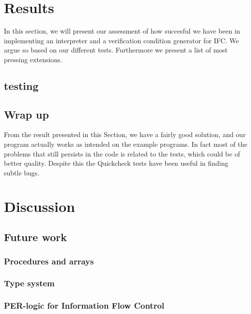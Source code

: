 \section{Results}
In this section, we will present our assessment of how succesful we have been in implementing an interpreter and a verification condition generator for IFC. We argue so based on our different tests. Furthermore we present a list of most pressing extensions.

\subsection{testing}


\subsection*{Wrap up}
From the result presented in this Section, we have a fairly good solution, and our program actually works as intended on the example programs.
In fact most of the problems that still persists in the code is related to the tests, which could be of better quality. Despite this the Quickcheck tests have been useful in finding subtle bugs.

\section{Discussion}

\subsection{Future work}

\subsubsection{Procedures and arrays}

\subsubsection{Type system}

\subsubsection{PER-logic for Information Flow Control}
